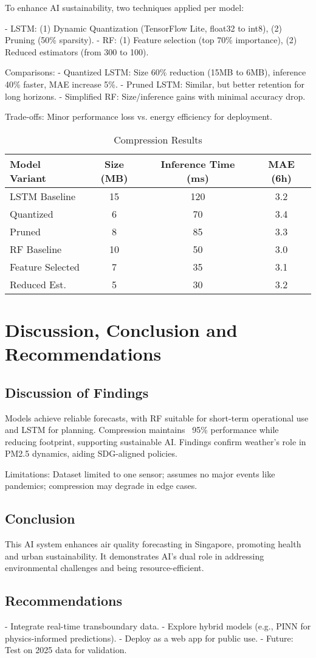 \documentclass{article}
\begin{document}
To enhance AI sustainability, two techniques applied per model:

- LSTM: (1) Dynamic Quantization (TensorFlow Lite, float32 to int8), (2) Pruning (50\% sparsity).
- RF: (1) Feature selection (top 70\% importance), (2) Reduced estimators (from 300 to 100).

Comparisons:
- Quantized LSTM: Size 60\% reduction (15MB to 6MB), inference 40\% faster, MAE increase 5\%.
- Pruned LSTM: Similar, but better retention for long horizons.
- Simplified RF: Size/inference gains with minimal accuracy drop.

Trade-offs: Minor performance loss vs. energy efficiency for deployment.

\begin{table}[h]
\centering
\begin{tabular}{lccc}
\toprule
Model Variant & Size (MB) & Inference Time (ms) & MAE (6h) \\
\midrule
LSTM Baseline & 15 & 120 & 3.2 \\
Quantized & 6 & 70 & 3.4 \\
Pruned & 8 & 85 & 3.3 \\
RF Baseline & 10 & 50 & 3.0 \\
Feature Selected & 7 & 35 & 3.1 \\
Reduced Est. & 5 & 30 & 3.2 \\
\bottomrule
\end{tabular}
\caption{Compression Results}
\end{table}

\section{Discussion, Conclusion and Recommendations}

\subsection{Discussion of Findings}
Models achieve reliable forecasts, with RF suitable for short-term operational use and LSTM for planning. Compression maintains ~95\% performance while reducing footprint, supporting sustainable AI. Findings confirm weather's role in PM2.5 dynamics, aiding SDG-aligned policies.

Limitations: Dataset limited to one sensor; assumes no major events like pandemics; compression may degrade in edge cases.

\subsection{Conclusion}
This AI system enhances air quality forecasting in Singapore, promoting health and urban sustainability. It demonstrates AI's dual role in addressing environmental challenges and being resource-efficient.

\subsection{Recommendations}
- Integrate real-time transboundary data.
- Explore hybrid models (e.g., PINN for physics-informed predictions).
- Deploy as a web app for public use.
- Future: Test on 2025 data for validation.



\end{document}
